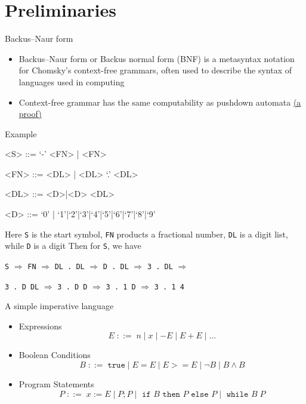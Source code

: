 \documentclass[presentation]{beamer}
\begin{document}
\section{Preliminaries}
\label{sec:orgcf696da}
\begin{frame}[label={sec:orgef21826}]{Backus–Naur form}
\begin{itemize}
\item \alert{Backus–Naur form} or \alert{Backus normal form} (BNF) is a metasyntax notation for Chomsky's context-free
grammars, often used to describe the syntax of languages used in computing
\item Context-free grammar has the same computability as pushdown automata \href{https://knightscholar.geneseo.edu/cgi/viewcontent.cgi?article=1001\&context=computability-oer}{(a proof)}
\end{itemize}
\end{frame}
\begin{frame}[label={sec:org5d673fa},fragile]{Example}
 \begin{grammar}
<S> ::= `-' <FN> | <FN>

<FN> ::= <DL> | <DL> `.' <DL>

<DL> ::= <D>|<D> <DL>

<D> ::=  `0' | `1'|`2'|`3'|`4'|`5'|`6'|`7'|`8'|`9'
\end{grammar}
\bigskip Here \texttt{S} is the start symbol, \texttt{FN} products a fractional number, \texttt{DL} is a digit list, while \texttt{D} is a digit
Then for \texttt{S}, we have
\begin{center}
\texttt{S} \(\Rightarrow\) \texttt{FN} \(\Rightarrow\)  \texttt{DL . DL} \(\Rightarrow\) \texttt{D . DL} \(\Rightarrow\) \texttt{3 . DL} \(\Rightarrow\)\par \texttt{3 . D DL} \(\Rightarrow\) \texttt{3 . D D}  \(\Rightarrow\)
\texttt{3 . 1 D} \(\Rightarrow\) \texttt{3 . 1 4}
\end{center}
\end{frame}
\begin{frame}[label={sec:orgb7cd74a}]{A simple imperative language}
\begin{itemize}
\item Expressions
\begin{equation*}
E\;::=\;n\mid x\mid -E\mid E+E\mid\dots
\end{equation*}
\item Boolean Conditions
\begin{equation*}
B\;::=\;\texttt{true}\mid E=E\mid E>= E\mid\neg B\mid B\wedge B
\end{equation*}
\item Program Statements
\begin{equation*}
P\;::=\; x:= E\mid P;P\mid\texttt{ if }B\texttt{ then }P\texttt{ else }P\mid\texttt{ while }B\; P
\end{equation*}
\end{itemize}
\end{frame}
\end{document}
